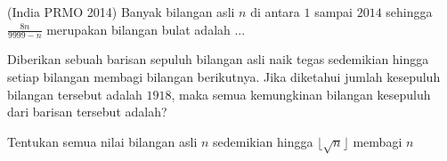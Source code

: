 \documentclass[11pt]{scrartcl}
\begin{document}
\begin{problem}
    (India PRMO 2014) Banyak bilangan asli $n$ di antara $1$ sampai $2014$ sehingga $\frac{8n}{9999 - n}$ merupakan bilangan bulat adalah ...
\end{problem}

\begin{problem}
    Diberikan sebuah barisan sepuluh bilangan asli naik tegas sedemikian hingga setiap bilangan membagi bilangan berikutnya. Jika diketahui jumlah kesepuluh bilangan tersebut adalah $1918$, maka semua kemungkinan bilangan kesepuluh dari barisan tersebut adalah?
\end{problem}

\begin{problem}
    Tentukan semua nilai bilangan asli $n$ sedemikian hingga $\lfloor \sqrt{n} \rfloor$ membagi $n$
\end{problem}


\end{document}
